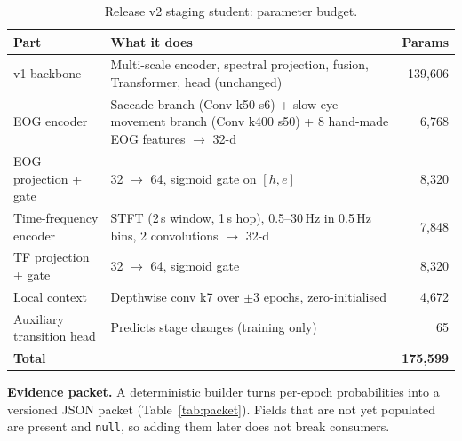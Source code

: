 \begin{table}[htbp]
\centering\small
\caption{Release v2 staging student: parameter budget.}
\label{tab:params}
\begin{tabularx}{\textwidth}{lYr}
\toprule
Part & What it does & Params \\
\midrule
v1 backbone & Multi-scale encoder, spectral projection, fusion, Transformer, head (unchanged) & 139,606 \\
EOG encoder & Saccade branch (Conv k50 s6) + slow-eye-movement branch (Conv k400 s50) + 8 hand-made EOG features $\rightarrow$ 32-d & 6,768 \\
EOG projection + gate & 32 $\rightarrow$ 64, sigmoid gate on $[h, e]$ & 8,320 \\
Time-frequency encoder & STFT (2\,s window, 1\,s hop), 0.5--30\,Hz in 0.5\,Hz bins, 2 convolutions $\rightarrow$ 32-d & 7,848 \\
TF projection + gate & 32 $\rightarrow$ 64, sigmoid gate & 8,320 \\
Local context & Depthwise conv k7 over $\pm$3 epochs, zero-initialised & 4,672 \\
Auxiliary transition head & Predicts stage changes (training only) & 65 \\
\midrule
\textbf{Total} & & \textbf{175,599} \\
\bottomrule
\end{tabularx}
\end{table}

\textbf{Evidence packet.} A deterministic builder turns per-epoch probabilities into a versioned JSON packet
(Table~\ref{tab:packet}). Fields that are not yet populated are present and \texttt{null}, so adding them later
does not break consumers.

